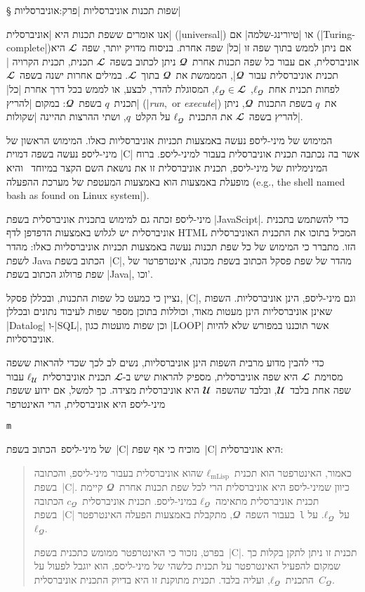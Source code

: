 \def\Title{מאוניברסליות לאגנטיות}


§ שפות תכנות אוניברסליות
|פרק:אוניברסליות|

אנו אומרים ששפת תכנות היא \ע|אוניברסלית| (\E|universal|) או \ע|טיורינג-שלמה| אם
(\E|Turing-complete|)אם ניתן לממש בתוך שפה זו \ע|כל| שפה אחרת. בניסוח מדויק
 יותר, שפה~$𝓛$ היא אוניברסלית, אם עבור כל שפה תכנות אחרת~$𝓠$ ניתן לכתוב
בשפה~$𝓛$ תכנית, תכנית הקרויה \ע|תכנית אוניברסלית עבור~$𝓠$|, המממשת את~$𝓠$
בתוך~$𝓛$. במילים אחרות ישנה בשפה~$𝓛$ לפחות תכנית אחת~$ℓ_𝓠$,~$ℓ_𝓠∈𝓛$, המסוגלת
להדר, לבצע, או לממש בכל דרך אחרת \ע|כל| תכנית~$q$ בשפת~$𝓠$: במקום \ע|להריץ|
(\E|\emph{run},~or \emph{execute}|) את~$q$ בשפת התכנות~$𝓠$, ניתן להריץ בשפה~$𝓛$
את התכנית~$ℓ_𝓠$ על הקלט~$q$, ושתי ההרצות תהיינה \ע|שקולות|.

המימוש של מיני-ליספ נעשה באמצעות תכניות אוניברסליות כאלו. המימוש
הראשון של מיני-ליספ נעשה בשפה דמוית \E|C| אשר בה נכתבה תכנית אוניברסלית בעבור
למיני-ליספ. ברוח המינימליות של מיני-ליספ, תכנית אוניברסלית זו את נושאת השם הקצר
במיוחד~ והיא מופעלת באמצעות הוא באמצעות המעטפת של מערכת ההפעלה
(e.g., the shell named bash as found on Linux system|).

מיני-ליספ זכתה גם למימוש בתכנית אוניברסלית בשפת \E|JavaScipt|. כדי להשתמש
בתכנית אוניברסלית יש לגלוש באמצעות הדפדפן לדף HTML המכיל בתוכו את התכנית
האוניברסלית הזו. מתברר כי המימוש של כל שפת תכנות נעשה באמצעות תכניות
אוניברסליות כאלו: מהדר לשפת Java הכתוב בשפת~\E|C|, מהדר של שפת פסקל הכתוב בשפת
מכונה, אינטרפרטר של שפת פרולוג הכתוב בשפת \E|Java|, וכו'.

נציין כי כמעט כל שפות התכנות, ובכללן פסקל, \E|C|, וגם מיני-ליספ, הינן
אוניברסליות. השפות שאינן אוניברסליות הינן מעטות מאוד, וכוללות בתוכן
מספר שפות לעיבוד נתונים ובכללן \E|Datalog| ו-\E|SQL|, וכן שפות מועטות כגון
\E|LOOP| אשר תוכננו במפורש שלא להיות אוניברסליות.

כדי להבין מדוע מרבית השפות הינן אוניברסליות, נשים לב לכך שכדי להראות ששפה
מסוימת~$𝓛$ היא שפה אוניברסלית, מספיק להראות שיש ב-$𝓛$ תכנית אוניברסלית~$ℓ_𝓤$
עבור שפה אחת בלבד~$𝓤$, ובלבד שהשפה~$𝓤$ היא אוניברסלית מצידה. כך למשל, אם ידוע
ששפת מיני-ליספ היא אוניברסלית, הרי האינטרפר~\begin{english}\verb|m|\end{english} של מיני-ליספ~הכתוב
בשפת~\E|C| מוכיח כי אף שפת~\E|C| היא אוניברסלית:

\begin{quote}
כאמור, האינטרפטר הוא תכנית~$ℓ_{\text{mLisp}}$ שהוא אוניברסלית בעבור מיני-ליספ,
והכתובה בשפת~\E|C|. כיוון שמיני-ליספ היא אוניברסלית הרי לכל שפת תכנות אחרת~$𝓠$
קיימת תכנית אוניברסלית מתאימה~$ℓ_𝓠$ במיני-ליספ. תכנית אוניברסלית~$c_𝓠$ הכתובה
בשפת~\E|C| בעבור השפה~$𝓠$, מתקבלת באמצעות הפעלה האינטרפטר~\texttt{l} על~$ℓ_𝓠$.
על~$ℓ_𝓠$.

בפרט, נזכור כי האינטרפטר ממומש כתכנית בשפת~\E|C|. תכנית זו ניתן לתקן בקלות כך
שמקום להפעיל האינטרפטר על תכנית כלשהי של מיני-ליספ, הוא יוגבל לפעול על
התכנית~$ℓ_𝓠$, ועליה בלבד. תכנית מתוקנת זו היא בדיוק התכנית אוניברסלית~$C_𝓠$.
\end{quote}

